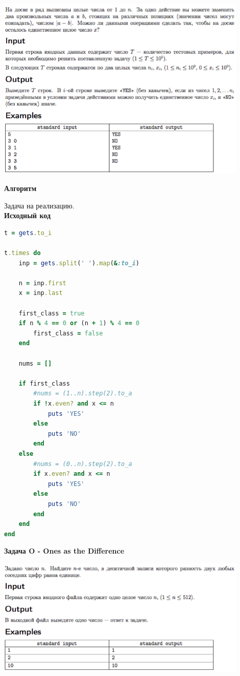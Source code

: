 \documentclass[a4paper,12pt]{article}
\begin{document}
\begin{center}
\includegraphics[width=0.9\textwidth]{OC_Bashkortostan/N.png}\\ [1cm]
\end{center}

\textbf{{\large Алгоритм}}

Задача на реализацию. \\
\newpage
\textbf{{\large Исходный код}} \\
\begin{lstlisting}[language=Ruby]
t = gets.to_i

t.times do
    inp = gets.split(' ').map(&:to_i)

    n = inp.first
    x = inp.last

    first_class = true
    if n % 4 == 0 or (n + 1) % 4 == 0
        first_class = false
    end

    nums = []

    if first_class
        #nums = (1..n).step(2).to_a
        if !x.even? and x <= n
            puts 'YES'
        else
            puts 'NO'
        end
    else
        #nums = (0..n).step(2).to_a
        if x.even? and x <= n
            puts 'YES'
        else
            puts 'NO'
        end
    end
end
\end{lstlisting}


\newpage
\textbf{{\large Задача O - Ones as the Difference}}

\begin{center}
\includegraphics[width=0.9\textwidth]{OC_Bashkortostan/O.png}\\ [1cm]
\end{center}
\end{document}
